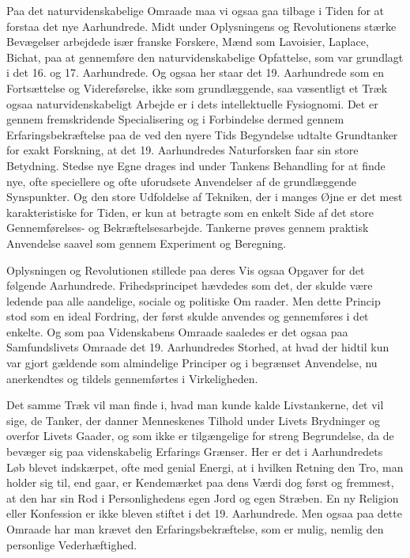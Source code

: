 \documentclass[12pt,a4paper,openany]{book}
\newcommand{\opage}[1]{\marginnote{\footnotesize\textit{[#1]}}}
\begin{document}
Paa det naturvidenskabelige Omraade maa vi ogsaa gaa tilbage i
Tiden for at forstaa det nye Aarhundrede. Midt under Oplysningens
og Revolutionens stærke Bevægelser arbejdede især franske Forskere,
Mænd som Lavoisier, Laplace, Bichat, paa at gennemføre den
naturvidenskabelige Opfattelse, som var grundlagt i det 16. og 17.
Aarhundrede. Og ogsaa her staar det 19. Aarhundrede som en Fortsættelse
og Videreførelse, ikke som grundlæggende, saa væsentligt
et Træk ogsaa naturvidenskabeligt Arbejde er i dets intellektuelle
Fysiognomi. Det er gennem fremskridende Specialisering og i Forbindelse
dermed gennem Erfaringsbekræftelse paa de ved den nyere
Tids Begyndelse udtalte Grundtanker for exakt Forskning, at det 19.
Aarhundredes Naturforsken faar sin store Betydning. Stedse nye
Egne drages ind under Tankens Behandling for at finde nye, ofte
speciellere og ofte uforudsete Anvendelser af de grundlæggende Synspunkter.
Og den store Udfoldelse af Tekniken, der i manges Øjne
er det mest karakteristiske for Tiden, er kun at betragte som en
enkelt Side af det store Gennemførelses- og Bekræftelsesarbejde.
Tankerne prøves gennem praktisk Anvendelse saavel som gennem
Experiment og Beregning.

Oplysningen og Revolutionen stillede paa deres Vis ogsaa Opgaver
for det følgende Aarhundrede. Frihedsprincipet hævdedes som det,
der skulde være ledende paa alle aandelige, sociale og politiske Om%
\opage{4}raader. Men dette Princip stod som en ideal Fordring, der først skulde
anvendes og gennemføres i det enkelte. Og som paa Videnskabens
Omraade saaledes er det ogsaa paa Samfundslivets Omraade det 19.
Aarhundredes Storhed, at hvad der hidtil kun var gjort gældende som
almindelige Principer og i begrænset Anvendelse, nu anerkendtes og
tildels gennemførtes i Virkeligheden.

Det samme Træk vil man finde i, hvad man kunde kalde Livstankerne,
det vil sige, de Tanker, der danner Menneskenes Tilhold
under Livets Brydninger og overfor Livets Gaader, og som ikke er
tilgængelige for streng Begrundelse, da de bevæger sig paa videnskabelig
Erfarings Grænser. Her er det i Aarhundredets Løb blevet indskærpet,
ofte med genial Energi, at i hvilken Retning den Tro, man
holder sig til, end gaar, er Kendemærket paa dens Værdi dog først
og fremmest, at den har sin Rod i Personlighedens egen Jord og egen
Stræben. En ny Religion eller Konfession er ikke bleven stiftet i det
19. Aarhundrede. Men ogsaa paa dette Omraade har man krævet
den Erfaringsbekræftelse, som er mulig, nemlig den personlige Vederhæftighed.
\end{document}
